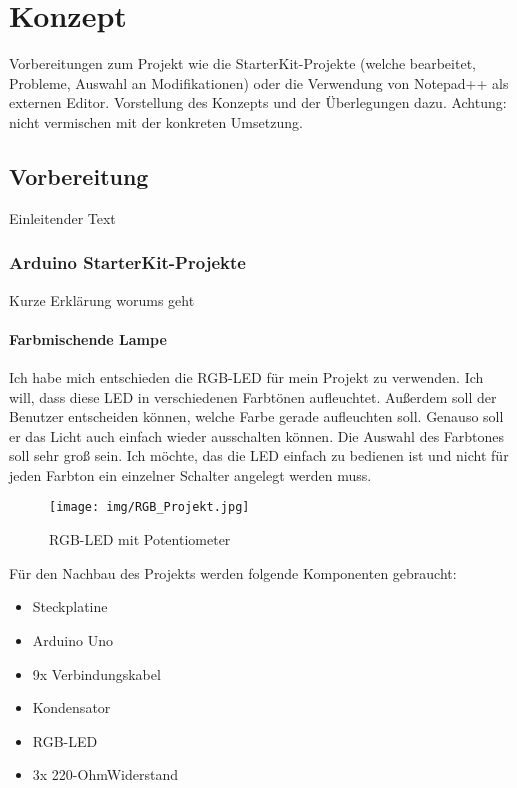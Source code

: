 \chapter{Konzept}

Vorbereitungen zum Projekt wie die StarterKit-Projekte (welche bearbeitet, Probleme, Auswahl an Modifikationen) oder die Verwendung von Notepad++ als externen Editor. Vorstellung des Konzepts und der Überlegungen dazu. Achtung: nicht vermischen mit der konkreten Umsetzung.

\section{Vorbereitung}
Einleitender Text
\subsection{Arduino StarterKit-Projekte}
Kurze Erklärung worums geht


\subsubsection{Farbmischende Lampe}

Ich habe mich entschieden die RGB-LED für mein Projekt zu verwenden. Ich will, dass diese LED in verschiedenen Farbtönen aufleuchtet. Außerdem soll der Benutzer entscheiden können, welche Farbe gerade aufleuchten soll. Genauso soll er das Licht auch einfach wieder ausschalten können. Die Auswahl des Farbtones soll sehr groß sein. Ich möchte, das die LED einfach zu bedienen ist und nicht für jeden Farbton ein einzelner Schalter angelegt werden muss.
\\

\begin{figure}[h]
\begin{center}
\texttt{[image: img/RGB\_Projekt.jpg]}
\caption{RGB-LED mit Potentiometer}
\label{rgb_project}
\end{center}
\end{figure}

Für den Nachbau des Projekts werden folgende Komponenten gebraucht:
\begin{itemize}
\item{Steckplatine}
\item{Arduino Uno}
\item{9x Verbindungskabel}
\item{Kondensator}
\item{RGB-LED}
\item{3x 220-OhmWiderstand}
\end{itemize}

